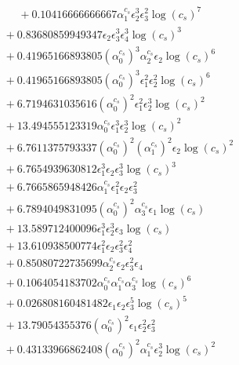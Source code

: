 \documentclass[10pt]{article}
\begin{document}
\begin{align*}
\phantom{F_{s,7}} &\phantom{={}}{}  + 0.10416666666667 \alpha_{1}^{c_s} \epsilon_{2}^{3} \epsilon_{3}^{2} \log{\left(c_{s} \right)}^{7} \\
&{}  + 0.83680859949347 \epsilon_{2} \epsilon_{3}^{3} \epsilon_{4}^{3} \log{\left(c_{s} \right)}^{3} \\
&{}  + 0.41965166893805 \left(\alpha_{0}^{c_s}\right)^{3} \alpha_{2}^{c_s} \epsilon_{2} \log{\left(c_{s} \right)}^{6} \\
&{}  + 0.41965166893805 \left(\alpha_{0}^{c_s}\right)^{3} \epsilon_{1}^{2} \epsilon_{2}^{2} \log{\left(c_{s} \right)}^{6} \\
&{}  + 6.7194631035616 \left(\alpha_{0}^{c_s}\right)^{2} \epsilon_{1}^{2} \epsilon_{2}^{3} \log{\left(c_{s} \right)}^{2} \\
&{}  + 13.494555123319 \alpha_{0}^{c_s} \epsilon_{1}^{3} \epsilon_{2}^{3} \log{\left(c_{s} \right)}^{2} \\
&{}  + 6.7611375793337 \left(\alpha_{0}^{c_s}\right)^{2} \left(\alpha_{1}^{c_s}\right)^{2} \epsilon_{2} \log{\left(c_{s} \right)}^{2} \\
&{}  + 6.7654939630812 \epsilon_{1}^{3} \epsilon_{2} \epsilon_{3}^{3} \log{\left(c_{s} \right)}^{3} \\
&{}  + 6.7665865948426 \alpha_{1}^{c_s} \epsilon_{1}^{2} \epsilon_{2} \epsilon_{3}^{2} \\
&{}  + 6.7894049831095 \left(\alpha_{0}^{c_s}\right)^{2} \alpha_{3}^{c_s} \epsilon_{1} \log{\left(c_{s} \right)} \\
&{}  + 13.589712400096 \epsilon_{1}^{3} \epsilon_{2}^{3} \epsilon_{3} \log{\left(c_{s} \right)} \\
&{}  + 13.610938500774 \epsilon_{1}^{2} \epsilon_{2} \epsilon_{3}^{2} \epsilon_{4}^{2} \\
&{}  + 0.85080722735699 \alpha_{2}^{c_s} \epsilon_{2} \epsilon_{3}^{2} \epsilon_{4} \\
&{}  + 0.1064054183702 \alpha_{0}^{c_s} \alpha_{1}^{c_s} \alpha_{3}^{c_s} \log{\left(c_{s} \right)}^{6} \\
&{}  + 0.026808160481482 \epsilon_{1} \epsilon_{2} \epsilon_{3}^{5} \log{\left(c_{s} \right)}^{5} \\
&{}  + 13.79054355376 \left(\alpha_{0}^{c_s}\right)^{2} \epsilon_{1} \epsilon_{2}^{2} \epsilon_{3}^{2} \\
&{}  + 0.43133966862408 \left(\alpha_{0}^{c_s}\right)^{2} \alpha_{1}^{c_s} \epsilon_{2}^{3} \log{\left(c_{s} \right)}^{2} \\

\end{align*}
\end{document}
